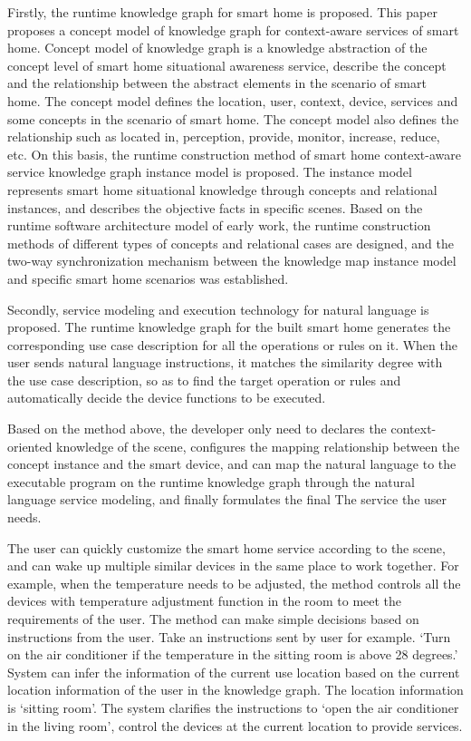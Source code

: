 Firstly, the runtime knowledge graph for smart home is proposed. This paper proposes a concept model of knowledge graph for context-aware services of smart home. Concept model of knowledge graph is a knowledge abstraction of the concept level of smart home situational awareness service, describe the concept and the relationship between the abstract elements in the scenario of smart home. The concept model defines the location, user, context, device, services and some concepts in the scenario of smart home. The concept model also defines the relationship such as located in, perception, provide, monitor, increase, reduce, etc. On this basis, the runtime construction method of smart home context-aware service knowledge graph instance model is proposed. The instance model represents smart home situational knowledge through concepts and relational instances, and describes the objective facts in specific scenes. Based on the runtime software architecture model of early work, the runtime construction methods of different types of concepts and relational cases are designed, and the two-way synchronization mechanism between the knowledge map instance model and specific smart home scenarios was established.

Secondly, service modeling and execution technology for natural language is proposed. The runtime knowledge graph for the built smart home generates the corresponding use case description for all the operations or rules on it. When the user sends natural language instructions, it matches the similarity degree with the use case description, so as to find the target operation or rules and automatically decide the device functions to be executed.

Based on the method above, the developer only need to declares the context-oriented knowledge of the scene, configures the mapping relationship between the concept instance and the smart device, and can map the natural language to the executable program on the runtime knowledge graph through the natural language service modeling, and finally formulates the final The service the user needs.

The user can quickly customize the smart home service according to the scene, and can wake up multiple similar devices in the same place to work together. For example, when the temperature needs to be adjusted, the method controls all the devices with temperature adjustment function in the room to meet the requirements of the user. The method can make simple decisions based on instructions from the user. Take an instructions sent by user for example. `Turn on the air conditioner if the temperature in the sitting room is above 28 degrees.' System can infer the information of the current use location based on the current location information of the user in the knowledge graph. The location information is `sitting room'. The system clarifies the instructions to `open the air conditioner in the living room', control the devices at the current location to provide services.

